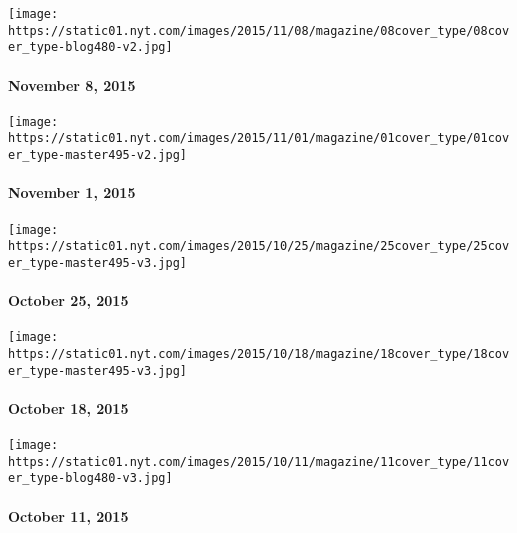 \texttt{[image: https://static01.nyt.com/images/2015/11/08/magazine/08cover\_type/08cover\_type-blog480-v2.jpg]}

\hypertarget{november-8-2015}{%
\paragraph{November 8, 2015}\label{november-8-2015}}

\href{http://www.nytimes.com/indexes/2015/11/01/magazine/index.html}{}

\texttt{[image: https://static01.nyt.com/images/2015/11/01/magazine/01cover\_type/01cover\_type-master495-v2.jpg]}

\hypertarget{november-1-2015}{%
\paragraph{November 1, 2015}\label{november-1-2015}}

\href{http://www.nytimes.com/indexes/2015/10/25/magazine/index.html}{}

\texttt{[image: https://static01.nyt.com/images/2015/10/25/magazine/25cover\_type/25cover\_type-master495-v3.jpg]}

\hypertarget{october-25-2015}{%
\paragraph{October 25, 2015}\label{october-25-2015}}

\href{http://www.nytimes.com/indexes/2015/10/18/magazine/index.html}{}

\texttt{[image: https://static01.nyt.com/images/2015/10/18/magazine/18cover\_type/18cover\_type-master495-v3.jpg]}

\hypertarget{october-18-2015}{%
\paragraph{October 18, 2015}\label{october-18-2015}}

\href{http://www.nytimes.com/indexes/2015/10/11/magazine/index.html}{}

\texttt{[image: https://static01.nyt.com/images/2015/10/11/magazine/11cover\_type/11cover\_type-blog480-v3.jpg]}

\hypertarget{october-11-2015}{%
\paragraph{October 11, 2015}\label{october-11-2015}}

